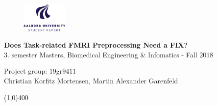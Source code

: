\clearpage
\thispagestyle{empty}

\begin{figure}[H]
	\raggedleft
	\includegraphics[width=0.2\textwidth]{figures/aaulogo-en.png}
\end{figure} 

\vspace{5 cm}

\begin{center}
	\begin{Huge}
		\textbf{Does Task-related FMRI Preprocessing Need a FIX?}\\
		\vspace{5 mm}
		3. semester Masters, Biomedical Engineering \& Infomatics - Fall $2018$\\
		\vspace{3 mm}
	\end{Huge}
	{\Large Project group: $19$gr$9411$} \\
	\vspace{1cm}
	\large{Christian Korfitz Mortensen, Martin Alexander Garenfeld}
\end{center}
\vspace*{\fill}

\begin{center}
	\line(1,0){400}
\end{center}

%
%
%
%
%	
%	
%	
%
%
%
\newpage
